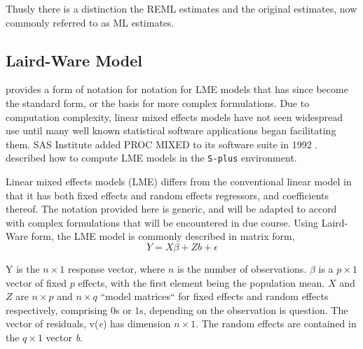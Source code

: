 \documentclass[12pt, a4paper]{report}
\theoremstyle{definition}
\theoremstyle{remark}
\begin{document}
Thusly there is a distinction the REML estimates and the original estimates, now commonly referred to as ML estimates.

\subsection{Laird-Ware Model} 
\citet{LW82} provides a form of notation for notation for LME models that has since become the standard form, or the basis for more complex formulations. Due to computation complexity, linear mixed effects models have not seen widespread use until many well known statistical software applications began facilitating them. SAS Institute added PROC MIXED to its software suite in 1992 \citep{singer}. \citet{PB} described how to compute LME models in the \texttt{S-plus} environment.

Linear mixed effects models (LME)
differs from the conventional linear model in that it has both
fixed effects and random effects regressors, and coefficients
thereof. The notation provided here is generic, and will be adapted to accord with complex formulations that will be encountered in due course. Using Laird-Ware form, the LME model is commonly described in matrix form,
\begin{equation}
Y = X\beta + Zb + \epsilon
\label{LW}
\end{equation}

Y is the $n \times 1$ response vector, where  $n$ is the number of observations. \textit{$\beta$} is a $p \times 1$ vector of fixed $p$ effects, with the
first element being the population mean. $X$ and $Z$ are $n \times p$ and $n \times q$ ``model matrices`` for fixed effects and random effects respectively, comprising
$0$s or $1$s, depending on the observation is question. The vector of residuals, v(\textit{e}) has
dimension $n \times 1$. The random effects are contained in the  $q \times
1$ vector \textit{b}.



\end{document}
